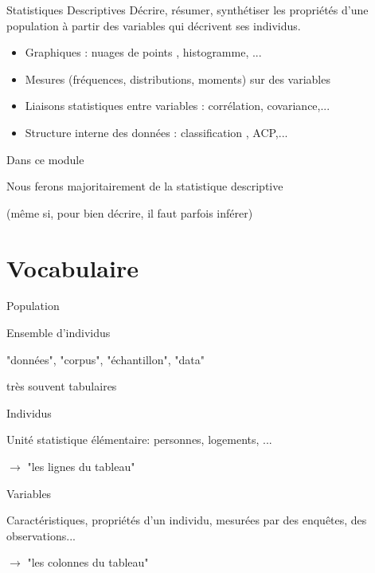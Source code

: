 \documentclass{beamer}
\begin{document}
\begin{frame}{Statistiques Descriptives} 
Décrire, résumer, synthétiser  les propriétés d'une \alert{population} à partir des \alert{variables} qui décrivent ses individus.

\begin{itemize}  
\item \alert{Graphiques} : nuages de points , histogramme, ...
\item \alert{Mesures} (fréquences, distributions, moments) sur des variables
\item \alert{Liaisons} statistiques entre variables : corrélation, covariance,...
\item \alert{Structure} interne des données : classification , ACP,...
\end{itemize}

\end{frame}

\begin{frame}{Dans ce module} 


Nous ferons majoritairement de la statistique \alert{descriptive}

(même si, pour bien décrire, il faut parfois inférer)

\end{frame}

\section{Vocabulaire }


 
\begin{frame}{Population}

 \alert{Ensemble} d'individus  
 
 "données", "corpus", "échantillon", "data"
 

très souvent \alert{tabulaires} 
\end{frame}
 
\begin{frame}{Individus}

 \alert{Unité} statistique \alert{élémentaire}: personnes, logements, ...
 
 
  $\rightarrow$ "les lignes du tableau"

\end{frame}

\begin{frame}{Variables} 


 \alert{Caractéristiques, propriétés} d’un individu, mesurées par des enquêtes, des observations...


$\rightarrow$ "les colonnes du tableau"  


\end{frame}
\end{document}

